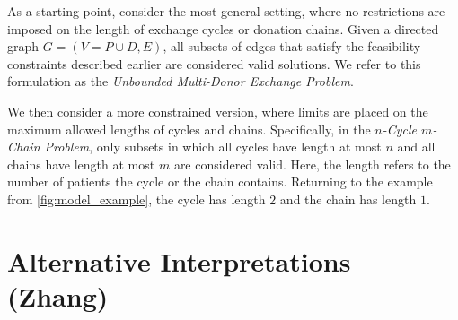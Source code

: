 As a starting point, consider the most general setting, where no restrictions are imposed on the length of exchange cycles or donation chains. Given a directed graph $G = (V = P \cup D, E)$, all subsets of edges that satisfy the feasibility constraints described earlier are considered valid solutions. We refer to this formulation as the \textit{Unbounded Multi-Donor Exchange Problem}.

We then consider a more constrained version, where limits are placed on the maximum allowed lengths of cycles and chains. Specifically, in the \textit{$n$-Cycle $m$-Chain Problem}, only subsets in which all cycles have length at most $n$ and all chains have length at most $m$ are considered valid. Here, the length refers to the number of patients the cycle or the chain contains. Returning to the example from \autoref{fig:model_example}, the cycle has length $2$ and the chain has length $1$.



\section{Alternative Interpretations (Zhang)}





